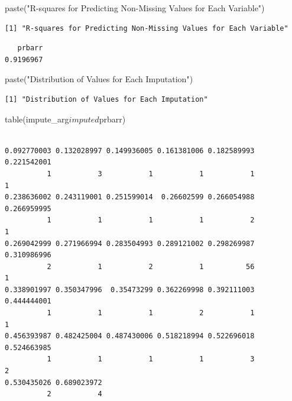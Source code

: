 \documentclass[]{article}
\newenvironment{Shaded}{}{}
\newcommand{\KeywordTok}[1]{\textcolor[rgb]{0.00,0.00,1.00}{#1}}
\newcommand{\NormalTok}[1]{#1}
\newcommand{\OperatorTok}[1]{#1}
\newcommand{\StringTok}[1]{\textcolor[rgb]{0.00,0.50,0.50}{#1}}
\begin{document}
\begin{Shaded}
\begin{Highlighting}[]
\KeywordTok{paste}\NormalTok{(}\StringTok{"R-squares for Predicting Non-Missing Values for Each Variable"}\NormalTok{)}
\end{Highlighting}
\end{Shaded}

\begin{verbatim}
[1] "R-squares for Predicting Non-Missing Values for Each Variable"
\end{verbatim}

\begin{Shaded}
\end{Shaded}

\begin{verbatim}
   prbarr 
0.9196967 
\end{verbatim}

\begin{Shaded}
\begin{Highlighting}[]
\KeywordTok{paste}\NormalTok{(}\StringTok{"Distribution of Values for Each Imputation"}\NormalTok{)}
\end{Highlighting}
\end{Shaded}

\begin{verbatim}
[1] "Distribution of Values for Each Imputation"
\end{verbatim}

\begin{Shaded}
\begin{Highlighting}[]
\KeywordTok{table}\NormalTok{(impute_arg}\OperatorTok{$}\NormalTok{imputed}\OperatorTok{$}\NormalTok{prbarr)}
\end{Highlighting}
\end{Shaded}

\begin{verbatim}

0.092770003 0.132028997 0.149936005 0.161381006 0.182589993 0.221542001 
          1           3           1           1           1           1 
0.238636002 0.243119001 0.251599014  0.26602599 0.266054988 0.266959995 
          1           1           1           1           2           1 
0.269042999 0.271966994 0.283504993 0.289121002 0.298269987 0.310986996 
          2           1           2           1          56           1 
0.338901997 0.350347996  0.35473299 0.362269998 0.392111003 0.444444001 
          1           1           1           2           1           1 
0.456393987 0.482425004 0.487430006 0.518218994 0.522696018 0.524663985 
          1           1           1           1           3           2 
0.530435026 0.689023972 
          2           4 
\end{verbatim}
\end{document}

